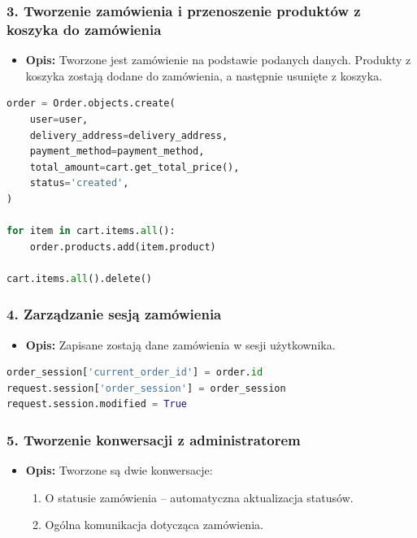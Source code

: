 \documentclass[12pt,a4paper,oneside]{article}
\theoremstyle{definition}
\numberwithin{equation}{section}
\begin{document}
\subsubsection*{3. Tworzenie zamówienia i przenoszenie produktów z koszyka do zamówienia}
\begin{itemize}
    \item \textbf{Opis:} Tworzone jest zamówienie na podstawie podanych danych. Produkty z koszyka zostają dodane do zamówienia, a następnie usunięte z koszyka.
\end{itemize}

\begin{lstlisting}[language=Python]
order = Order.objects.create(
    user=user,
    delivery_address=delivery_address,
    payment_method=payment_method,
    total_amount=cart.get_total_price(),
    status='created',
)

for item in cart.items.all():
    order.products.add(item.product)

cart.items.all().delete()
\end{lstlisting}



\subsubsection*{4. Zarządzanie sesją zamówienia}
\begin{itemize}
    \item \textbf{Opis:} Zapisane zostają dane zamówienia w sesji użytkownika.
\end{itemize}

\begin{lstlisting}[language=Python]
order_session['current_order_id'] = order.id
request.session['order_session'] = order_session
request.session.modified = True
\end{lstlisting}



\subsubsection*{5. Tworzenie konwersacji z administratorem}
\begin{itemize}
    \item \textbf{Opis:} Tworzone są dwie konwersacje:
    \begin{enumerate}
        \item O statusie zamówienia – automatyczna aktualizacja statusów.
        \item Ogólna komunikacja dotycząca zamówienia.
    \end{enumerate}
\end{itemize}
\end{document}
